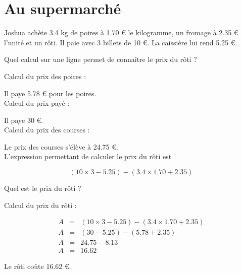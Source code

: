 \section{Au supermarché}

Joshua achète \num{3.4} kg de poires à \num{1,70} € le kilogramme, un fromage à \num{2.35} € l'unité et un rôti.
Il paie avec 3 billets de 10 €. La caissière lui rend \num{5.25} €.

\begin{questions}
	\question Quel calcul sur une ligne permet de connaître le prix du rôti ?
	\begin{solution}
		Calcul du prix des poires :
		
		
		Il paye \num{5.78} € pour les poires.\\
		
		Calcul du prix payé :
		
		
		Il paye 30 €.\\
		
		Calcul du prix des courses :
		
		Le prix des courses s'élève à \num{24.75} €.\\
		
		L'expression permettant de calculer le prix du rôti est
		
		\begin{equation}
			(10 \times 3 - \num{5.25}) - (\num{3.4} \times \num{1.70} + \num{2.35})
		\end{equation}
		
	\end{solution}
	\question Quel est le prix du rôti ?
	\begin{solution}
		Calcul du prix du rôti :
		
		
		\begin{eqnarray*}
			A &=& (10 \times 3 - \num{5.25}) - (\num{3.4} \times \num{1.70} + \num{2.35}) \\
			A &=& (30 - \num{5.25}) - (\num{5.78} + \num{2.35}) \\
			A &=& \num{24.75} - \num{8.13} \\
			A &=& \num{16.62}
		\end{eqnarray*}
	
		Le rôti coûte \num{16.62} €.
	\end{solution}
\end{questions}